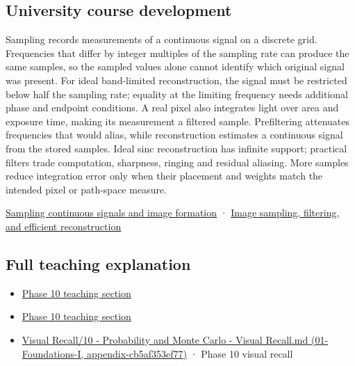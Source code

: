 \subsection{University course development}\label{university-course-development}

Sampling records measurements of a continuous signal on a discrete grid. Frequencies that differ by integer multiples of the sampling rate can produce the same samples, so the sampled values alone cannot identify which original signal was present. For ideal band-limited reconstruction, the signal must be restricted below half the sampling rate; equality at the limiting frequency needs additional phase and endpoint conditions. A real pixel also integrates light over area and exposure time, making its measurement a filtered sample. Prefiltering attenuates frequencies that would alias, while reconstruction estimates a continuous signal from the stored samples. Ideal sinc reconstruction has infinite support; practical filters trade computation, sharpness, ringing and residual aliasing. More samples reduce integration error only when their placement and weights match the intended pixel or path-space measure.

\href{Continuous\%20Notes/University\%20-\%20Worlds,\%20Images\%20and\%20Inference\%20-\%20Graphics,\%20Vision\%20and\%20Photography\#Sampling\%20continuous\%20signals\%20and\%20image\%20formation}{Sampling continuous signals and image formation} · \href{Continuous\%20Notes/University\%20-\%20Worlds,\%20Images\%20and\%20Inference\%20-\%20Graphics,\%20Vision\%20and\%20Photography\#Image\%20sampling,\%20filtering,\%20and\%20efficient\%20reconstruction}{Image sampling, filtering, and efficient reconstruction}

\subsection{Full teaching explanation}\label{full-teaching-explanation}

\begin{itemize}
\tightlist
\item
  \href{Continuous\%20Notes/Computing\%20Foundations\%20-\%20From\%20Bits\%20to\%20C++\%20and\%20Systems\%20APIs\#6.\%20A\%20computer\%20produces\%20deterministic\%20pseudorandom\%20sequences}{Phase 10 teaching section}
\item
  \href{Continuous\%20Notes/Computing\%20Foundations\%20-\%20From\%20Bits\%20to\%20C++\%20and\%20Systems\%20APIs\#8.\%20Monte\%20Carlo\%20estimates\%20trade\%20computation\%20for\%20uncertainty}{Phase 10 teaching section}
\item
  \href{}{Visual Recall/10 - Probability and Monte Carlo - Visual Recall.md (01-Foundations-I, appendix-cb5af353ef77)} · Phase 10 visual recall
\end{itemize}

